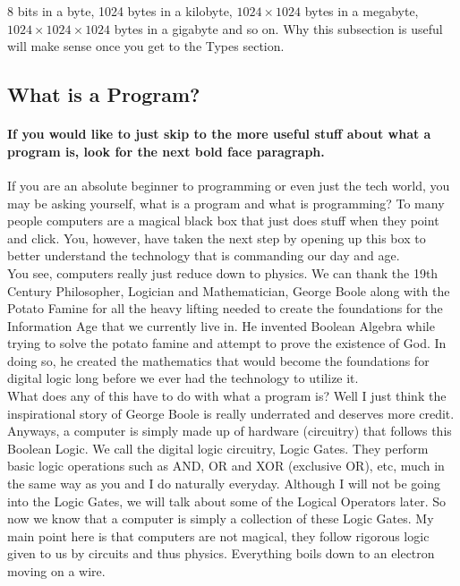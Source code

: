 \documentclass[11]{article}
\begin{document}
8 bits in a byte, 1024 bytes in a kilobyte, $1024 \times 1024$ bytes in a megabyte, $1024 \times 1024 \times 1024$ bytes in a gigabyte and so on. Why this subsection is useful will make sense once you get to the Types section.

\subsection{What is a Program?}
\paragraph{If you would like to just skip to the more useful stuff about what a program is, look for the next bold face paragraph.}
If you are an absolute beginner to programming or even just the tech world, you may be asking yourself, what is a program and what is programming? To many people computers are a magical black box that just does stuff when they point and click. You, however, have taken the next step by opening up this box to better understand the technology that is commanding our day and age.\\

You see, computers really just reduce down to physics. We can thank the 19th Century Philosopher, Logician and Mathematician, George Boole along with the Potato Famine for all the heavy lifting needed to create the foundations for the Information Age that we currently live in. He invented Boolean Algebra while trying to solve the potato famine and attempt to prove the existence of God. In doing so, he created the mathematics that would become the foundations for digital logic long before we ever had the technology to utilize it.\\

What does any of this have to do with what a program is? Well I just think the inspirational story of George Boole is really underrated and deserves more credit. Anyways, a computer is simply made up of hardware (circuitry) that follows this Boolean Logic. We call the digital logic circuitry, Logic Gates. They perform basic logic operations such as AND, OR and XOR (exclusive OR), etc, much in the same way as you and I do naturally everyday. Although I will not be going into the Logic Gates, we will talk about some of the Logical Operators later. So now we know that a computer is simply a collection of these Logic Gates. My main point here is that computers are not magical, they follow rigorous logic given to us by circuits and thus physics. Everything boils down to an electron moving on a wire.\\
\end{document}
